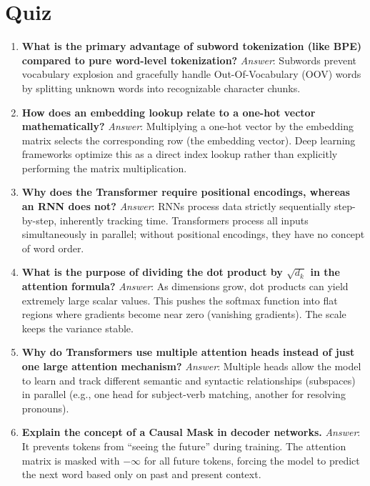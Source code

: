 \documentclass[11pt, a4paper]{article}
\begin{document}
\newpage
\section*{Quiz}
\begin{enumerate}[label=\textbf{Q\arabic*.}]
\item \textbf{What is the primary advantage of subword tokenization (like BPE) compared to pure word-level tokenization?}  
\textit{Answer}: Subwords prevent vocabulary explosion and gracefully handle Out-Of-Vocabulary (OOV) words by splitting unknown words into recognizable character chunks.

\item \textbf{How does an embedding lookup relate to a one-hot vector mathematically?}  
\textit{Answer}: Multiplying a one-hot vector by the embedding matrix selects the corresponding row (the embedding vector). Deep learning frameworks optimize this as a direct index lookup rather than explicitly performing the matrix multiplication.

\item \textbf{Why does the Transformer require positional encodings, whereas an RNN does not?}  
\textit{Answer}: RNNs process data strictly sequentially step-by-step, inherently tracking time. Transformers process all inputs simultaneously in parallel; without positional encodings, they have no concept of word order.

\item \textbf{What is the purpose of dividing the dot product by $\sqrt{d_k}$ in the attention formula?}  
\textit{Answer}: As dimensions grow, dot products can yield extremely large scalar values. This pushes the softmax function into flat regions where gradients become near zero (vanishing gradients). The scale keeps the variance stable.

\item \textbf{Why do Transformers use multiple attention heads instead of just one large attention mechanism?}  
\textit{Answer}: Multiple heads allow the model to learn and track different semantic and syntactic relationships (subspaces) in parallel (e.g., one head for subject-verb matching, another for resolving pronouns).

\item \textbf{Explain the concept of a Causal Mask in decoder networks.}  
\textit{Answer}: It prevents tokens from ``seeing the future'' during training. The attention matrix is masked with $-\infty$ for all future tokens, forcing the model to predict the next word based only on past and present context.


\end{enumerate}
\end{document}
